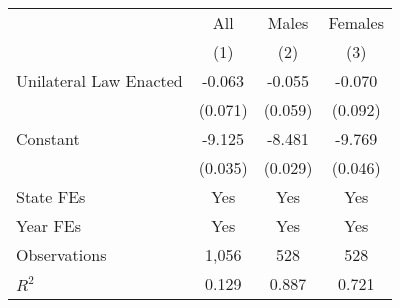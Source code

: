 \begin{tabular}{@{}l*{3}{c}}
\toprule \toprule
  & All & Males & Females \\
  & (1) & (2)   & (3)     \\ 
\toprule
Unilateral Law Enacted&      -0.063         &      -0.055         &      -0.070         \\
                    &     (0.071)         &     (0.059)         &     (0.092)         \\
Constant            &      -9.125\sym{***}&      -8.481\sym{***}&      -9.769\sym{***}\\
                    &     (0.035)         &     (0.029)         &     (0.046)         \\
State FEs           &         Yes         &         Yes         &         Yes         \\
Year FEs            &         Yes         &         Yes         &         Yes         \\
Observations        &       1,056         &         528         &         528         \\
\(R^2\)             &       0.129         &       0.887         &       0.721         \\
\bottomrule \bottomrule \end{tabular}
